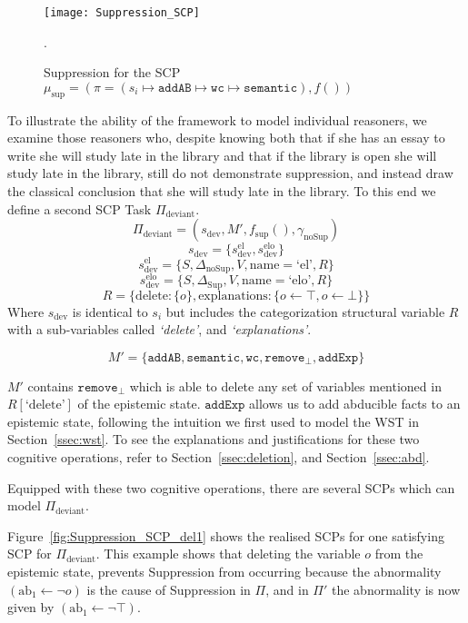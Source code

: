 \begin{figure}
\centering \texttt{[image: Suppression\_SCP]}
\caption{Suppression for the SCP $\mu_\text{sup}=(\pi=(s_i \longmapsto \texttt{addAB} \longmapsto \texttt{wc} \longmapsto \texttt{semantic}),f())$}.
\label{fig:Suppression_SCP}
\end{figure}


To illustrate the ability of the framework to model individual reasoners, we examine those reasoners who, despite knowing both that if she has an essay to write she will study late in the library and that if the library is open she will study late in the library, still do not demonstrate suppression, and instead draw the classical conclusion that she will study late in the library. To this end we define a second SCP Task $\Pi_\text{deviant}$.
\[\Pi_\text{deviant}=(s_\text{dev},M',f_\text{sup}(),\gamma_{\text{noSup}})\]
\[s_\text{dev}=\{s_\text{dev}^\text{el},s_\text{dev}^\text{elo}\}\]
\[s_\text{dev}^\text{el}=\{S,\Delta_\text{noSup}, V, \text{name}=\text{`el'},R\} \]
\[s_\text{dev}^\text{elo}=\{S,\Delta_\text{Sup}, V, \text{name}=\text{`elo'},R\} \]
\[
R=\{\text{delete}:\{o\}, \text{explanations}:\{o\leftarrow \top, o\leftarrow \bot\}\}
\]
Where $s_\text{dev}$ is identical to $s_i$ but includes the categorization structural variable $R$ with a sub-variables called \textit{`delete'}, and \textit{`explanations'}. 

\[M'=\{\texttt{addAB}, \texttt{semantic}, \texttt{wc}, \texttt{remove}_\bot, \texttt{addExp}\}\]

$M'$ contains $\texttt{remove}_\bot$ which is able to delete any set of variables mentioned in $R[\text{`delete'}]$ of the epistemic state. $\texttt{addExp}$ allows us to add abducible facts to an epistemic state, following the intuition we first used to model the WST in Section~\ref{ssec:wst}. To see the explanations and justifications for these two cognitive operations, refer to Section~\ref{ssec:deletion}, and Section~\ref{ssec:abd}.

Equipped with these two cognitive operations, there are several SCPs which can model $\Pi_\text{deviant}$.

Figure~\ref{fig:Suppression_SCP_del1} shows the realised SCPs for one satisfying SCP for $\Pi_\text{deviant}$. This example shows that deleting the variable $o$ from the epistemic state, prevents Suppression from occurring because the abnormality $(\text{ab}_1 \leftarrow \lnot o )$ is the cause of Suppression in $\Pi$, and in $\Pi'$ the abnormality is now given by $(\text{ab}_1 \leftarrow \lnot \top )$.

